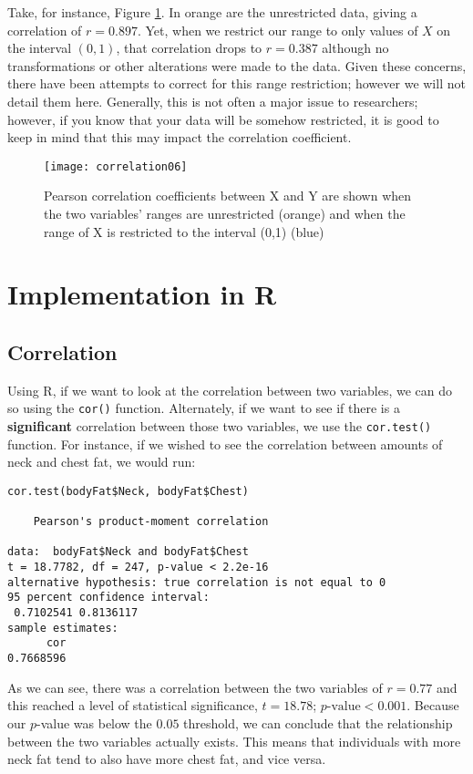 Take, for instance, Figure \ref{fig:correlation06}. In orange are the unrestricted data, giving a correlation of $r=0.897$. Yet, when we restrict our range to only values of $X$ on the interval $(0,1)$, that correlation drops to $r=0.387$ although no transformations or other alterations were made to the data. Given these concerns, there have been attempts to correct for this range restriction; however we will not detail them here. Generally, this is not often a major issue to researchers; however, if you know that your data will be somehow restricted, it is good to keep in mind that this may impact the correlation coefficient.

\begin{figure}[h]
\texttt{[image: correlation06]}
\caption{Pearson correlation coefficients between X and Y are shown when the two variables' ranges are unrestricted (orange) and when the range of X is restricted to the interval (0,1) (blue)}
\label{fig:correlation06}
\end{figure}

\section{Implementation in R}

\subsection{Correlation}
Using R, if we want to look at the correlation between two variables, we can do so using the \verb|cor()| function. Alternately, if we want to see if there is a \textbf{significant} correlation between those two variables, we use the \verb|cor.test()| function. For instance, if we wished to see the correlation between amounts of neck and chest fat, we would run:

\begin{framed}
\begin{Verbatim}[samepage=TRUE]
cor.test(bodyFat$Neck, bodyFat$Chest)

	Pearson's product-moment correlation

data:  bodyFat$Neck and bodyFat$Chest
t = 18.7782, df = 247, p-value < 2.2e-16
alternative hypothesis: true correlation is not equal to 0
95 percent confidence interval:
 0.7102541 0.8136117
sample estimates:
      cor 
0.7668596 
\end{Verbatim}
\end{framed}

As we can see, there was a correlation between the two variables of $r=0.77$ and this reached a level of statistical significance, $t = 18.78$; $p\text{-value}<0.001$. Because our $p$-value was below the $0.05$ threshold, we can conclude that the relationship between the two variables actually exists. This means that individuals with more neck fat tend to also have more chest fat, and vice versa.

